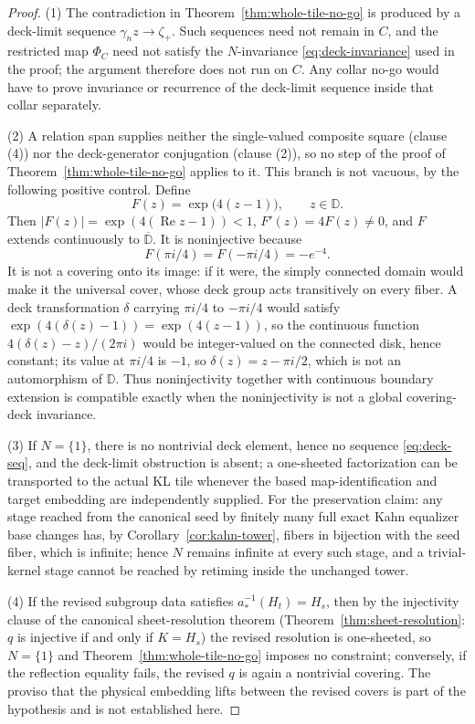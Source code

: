\documentclass[11pt,reqno]{amsart}
\theoremstyle{definition}
\theoremstyle{remark}
\begin{document}
\begin{proof}
(1)  The contradiction in Theorem~\ref{thm:whole-tile-no-go} is produced by a deck-limit sequence \(\gamma_nz\to\zeta_+\).  Such sequences need not remain in \(C\), and the restricted map \(\Phi_C\) need not satisfy the \(N\)-invariance \eqref{eq:deck-invariance} used in the proof; the argument therefore does not run on \(C\).  Any collar no-go would have to prove invariance or recurrence of the deck-limit sequence inside that collar separately.

(2)  A relation span supplies neither the single-valued composite square (clause (4)) nor the deck-generator conjugation (clause (2)), so no step of the proof of Theorem~\ref{thm:whole-tile-no-go} applies to it.  This branch is not vacuous, by the following positive control.  Define
\[
F(z)=\exp\bigl(4(z-1)\bigr),\qquad z\in\mathbb D.
\]
Then \(|F(z)|=\exp(4(\operatorname{Re}z-1))<1\), \(F'(z)=4F(z)\ne0\), and \(F\) extends continuously to \(\overline{\mathbb D}\).  It is noninjective because
\[
F(\pi i/4)=F(-\pi i/4)=-e^{-4}.
\]
It is not a covering onto its image: if it were, the simply connected domain would make it the universal cover, whose deck group acts transitively on every fiber.  A deck transformation \(\delta\) carrying \(\pi i/4\) to \(-\pi i/4\) would satisfy \(\exp(4(\delta(z)-1))=\exp(4(z-1))\), so the continuous function \(4(\delta(z)-z)/(2\pi i)\) would be integer-valued on the connected disk, hence constant; its value at \(\pi i/4\) is \(-1\), so \(\delta(z)=z-\pi i/2\), which is not an automorphism of \(\mathbb D\).  Thus noninjectivity together with continuous boundary extension is compatible exactly when the noninjectivity is not a global covering-deck invariance.

(3)  If \(N=\{1\}\), there is no nontrivial deck element, hence no sequence \eqref{eq:deck-seq}, and the deck-limit obstruction is absent; a one-sheeted factorization can be transported to the actual KL tile whenever the based map-identification and target embedding are independently supplied.  For the preservation claim: any stage reached from the canonical seed by finitely many full exact Kahn equalizer base changes has, by Corollary~\ref{cor:kahn-tower}, fibers in bijection with the seed fiber, which is infinite; hence \(N\) remains infinite at every such stage, and a trivial-kernel stage cannot be reached by retiming inside the unchanged tower.

(4)  If the revised subgroup data satisfies \(a_*^{-1}(H_t)=H_s\), then by the injectivity clause of the canonical sheet-resolution theorem (Theorem~\ref{thm:sheet-resolution}: \(q\) is injective if and only if \(K=H_s\)) the revised resolution is one-sheeted, so \(N=\{1\}\) and Theorem~\ref{thm:whole-tile-no-go} imposes no constraint; conversely, if the reflection equality fails, the revised \(q\) is again a nontrivial covering.  The proviso that the physical embedding lifts between the revised covers is part of the hypothesis and is not established here.
\end{proof}
\end{document}
